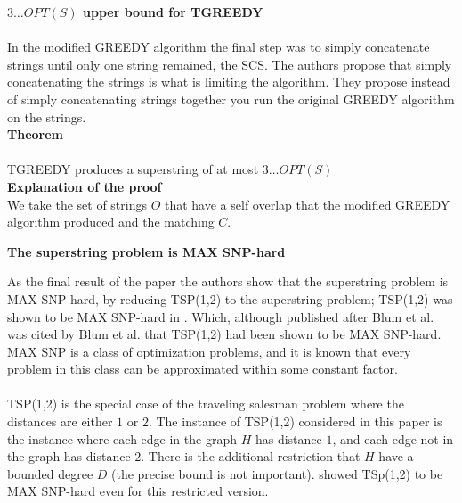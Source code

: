 \documentclass[letterpaper,11pt,titlepage]{article}
\begin{document}
\textbf{$3 \ldots OPT(S)$ upper bound for TGREEDY}\\\\

In the modified GREEDY algorithm the final step was to simply concatenate strings until only one string remained, the SCS. The authors propose that simply concatenating the strings is what is limiting the algorithm. They propose instead of simply concatenating strings together you run the original GREEDY algorithm on the strings. \\

\textbf{Theorem} \\\\
TGREEDY produces a superstring of at most $3 \ldots OPT(S)$\\

\textbf{Explanation of the proof}\\

We take the set of strings $O$ that have a self overlap that the modified GREEDY algorithm produced and the matching $C$. 


\textbf{The superstring problem is MAX SNP-hard}

As the final result of the paper the authors show that the superstring problem is MAX SNP-hard, by reducing TSP(1,2) to the superstring problem; TSP(1,2) was shown to be MAX SNP-hard in \cite{papadimitriou1993}.  Which, although published after Blum et al. was cited by Blum et al. that TSP(1,2) had been shown to be MAX SNP-hard.  MAX SNP is a class of optimization problems, and it is known that every problem in this class can be approximated within some constant factor.  \\ \\

TSP(1,2) is the special case of the traveling salesman problem where the distances are either $1$ or $2$.  The instance of TSP(1,2) considered in this paper is the instance where each edge in the graph $H$ has distance $1$, and each edge not in the graph has distance $2$.  There is the additional restriction that $H$ have a bounded degree $D$ (the precise bound is not important).  \cite{papadimitriou1993} showed TSp(1,2) to be MAX SNP-hard even for this restricted version.   \\ \\
\end{document}
